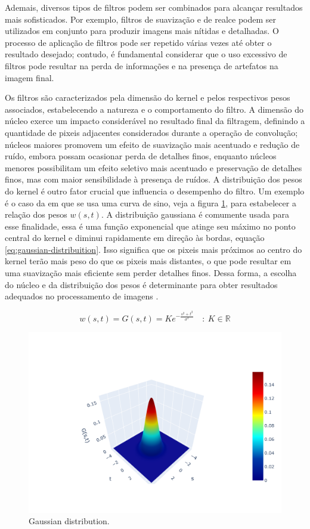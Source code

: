 Ademais, diversos tipos de filtros podem ser combinados para alcançar resultados mais sofisticados. Por exemplo, filtros de suavização e de realce podem ser utilizados em conjunto para produzir imagens mais nítidas e detalhadas. O processo de aplicação de filtros pode ser repetido várias vezes até obter o resultado desejado; contudo, é fundamental considerar que o uso excessivo de filtros pode resultar na perda de informações e na presença de artefatos na imagem final.


Os filtros são caracterizados pela dimensão do kernel e pelos respectivos pesos associados, estabelecendo a natureza e o comportamento do filtro. A dimensão do núcleo exerce um impacto considerável no resultado final da filtragem, definindo a quantidade de pixeis adjacentes considerados durante a operação de convolução; núcleos maiores promovem um efeito de suavização mais acentuado e redução de ruído, embora possam ocasionar perda de detalhes finos, enquanto núcleos menores possibilitam um efeito seletivo mais acentuado e preservação de detalhes finos, mas com maior sensibilidade à presença de ruídos. A distribuição dos pesos do kernel é outro fator crucial que influencia o desempenho do filtro. Um exemplo é o caso da em que se usa uma curva de sino, veja a figura \ref{fig:gaussian3d}, para estabelecer a relação dos pesos $w(s, t)$.  A distribuição gaussiana é comumente usada para esse finalidade, essa é uma função exponencial que atinge seu máximo no ponto central do kernel e diminui rapidamente em direção às bordas, equação \ref{eq:gaussian-distribuition}. Isso significa que os pixeis mais próximos ao centro do kernel terão mais peso do que os pixeis mais distantes, o que pode resultar em uma suavização mais eficiente sem perder detalhes finos. Dessa forma, a escolha do núcleo e da distribuição dos pesos é determinante para obter resultados adequados no processamento de imagens \cite{gonzalez_rafael_c_digital_2018, mcandrew2004introduction, DHAEYER1989}.

\begin{equation}
    w(s,t) = G(s, t) = K e^{-\frac{s^2 + t^2}{\sigma^2}} \quad  :\ K \in \mathbb{R}
    \label{eq:gaussian-distribuition}
\end{equation}

\begin{figure}[h!]
\centering
\includegraphics[width=.65\linewidth]{images/Development/chap3/gaussian_3d_plot.png}
\caption{Gaussian distribution.}
\label{fig:gaussian3d}
\end{figure}

